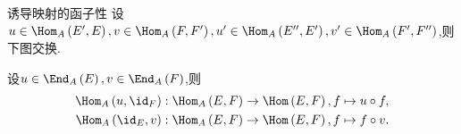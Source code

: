 \begin{proposition}{诱导映射的函子性}{}
	设$u\in\Hom_{A}\left(E^{\prime},E\right),v\in\Hom_{A}\left(F,F^{\prime}\right),u^{\prime}\in\Hom_{A}\left(E^{\prime\prime},E^{\prime}\right),v^{\prime}\in\Hom_{A}\left(F^{\prime},F^{\prime\prime}\right)$,则下图交换.
	\begin{center}
	\end{center}
\end{proposition}

\begin{proposition}{}{}
	设$u\in\End_{{A}}\left(E\right),v\in\End_{{A}}\left(F\right)$,则
	\begin{align*}
		\Hom_{A}\left(u,\id_{F}\right):\Hom_{A}\left(E,F\right)\to\Hom\left(E,F\right),f\mapsto u\circ f,\\
		\Hom_{A}\left(\id_{E},v\right):\Hom_{A}\left(E,F\right)\to\Hom\left(E,F\right),f\mapsto f\circ v.
	\end{align*}
\end{proposition}




















































